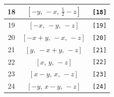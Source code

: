 \documentclass[fleqn,8pt]{jsarticle}
\begin{document}
\begin{longtable}{ccc}
18 & $\left[ - y,\, - x,\, \frac{1}{2} - z \right]$ & {\tt [18]} \\ \hline
19 & $\left[ - x,\, - y,\, - z \right]$ & {\tt [19]} \\ \hline
20 & $\left[ - x + y,\, - x,\, - z \right]$ & {\tt [20]} \\ \hline
21 & $\left[ y,\, - x + y,\, - z \right]$ & {\tt [21]} \\ \hline
22 & $\left[ x,\, y,\, - z \right]$ & {\tt [22]} \\ \hline
23 & $\left[ x - y,\, x,\, - z \right]$ & {\tt [23]} \\ \hline
24 & $\left[ - y,\, x - y,\, - z \right]$ & {\tt [24]} \\
\end{longtable}
\end{document}
